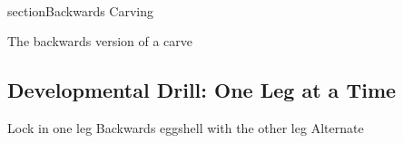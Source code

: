 \\section{Backwards Carving}
\label{sec:sticky/backwards_carves}

The backwards version of a carve



\subsection*{Developmental Drill: One Leg at a Time}
Lock in one leg
Backwards eggshell with the other leg
Alternate


